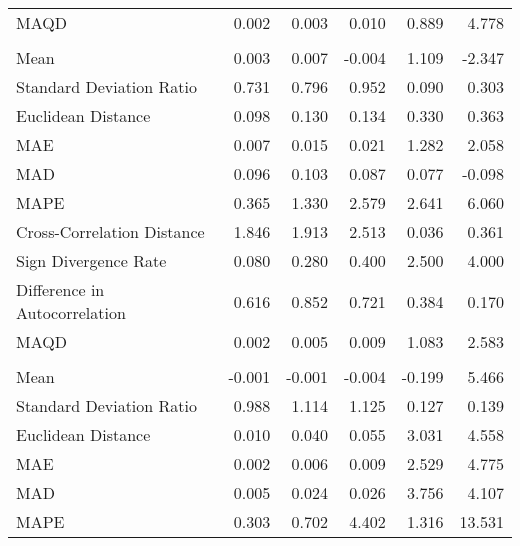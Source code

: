 \begin{landscape}
\begin{ThreePartTable}
\begin{longtable}[t]{lrrrrr}
\hspace{1em}MAQD & 0.002 & 0.003 & 0.010 & 0.889 & 4.778\\
\addlinespace[0.5em]
\multicolumn{6}{l}{\textbf{ROU}}\\
\hline
\hspace{1em}Mean & 0.003 & 0.007 & -0.004 & 1.109 & -2.347\\
\hspace{1em}Standard Deviation Ratio & 0.731 & 0.796 & 0.952 & 0.090 & 0.303\\
\hspace{1em}Euclidean Distance & 0.098 & 0.130 & 0.134 & 0.330 & 0.363\\
\hspace{1em}MAE & 0.007 & 0.015 & 0.021 & 1.282 & 2.058\\
\hspace{1em}MAD & 0.096 & 0.103 & 0.087 & 0.077 & -0.098\\
\hspace{1em}MAPE & 0.365 & 1.330 & 2.579 & 2.641 & 6.060\\
\hspace{1em}Cross-Correlation Distance & 1.846 & 1.913 & 2.513 & 0.036 & 0.361\\
\hspace{1em}Sign Divergence Rate & 0.080 & 0.280 & 0.400 & 2.500 & 4.000\\
\hspace{1em}Difference in Autocorrelation & 0.616 & 0.852 & 0.721 & 0.384 & 0.170\\
\hspace{1em}MAQD & 0.002 & 0.005 & 0.009 & 1.083 & 2.583\\
\addlinespace[0.5em]
\multicolumn{6}{l}{\textbf{RUS}}\\
\hline
\hspace{1em}Mean & -0.001 & -0.001 & -0.004 & -0.199 & 5.466\\
\hspace{1em}Standard Deviation Ratio & 0.988 & 1.114 & 1.125 & 0.127 & 0.139\\
\hspace{1em}Euclidean Distance & 0.010 & 0.040 & 0.055 & 3.031 & 4.558\\
\hspace{1em}MAE & 0.002 & 0.006 & 0.009 & 2.529 & 4.775\\
\hspace{1em}MAD & 0.005 & 0.024 & 0.026 & 3.756 & 4.107\\
\hspace{1em}MAPE & 0.303 & 0.702 & 4.402 & 1.316 & 13.531\\

\end{longtable}
\end{ThreePartTable}
\end{landscape}
